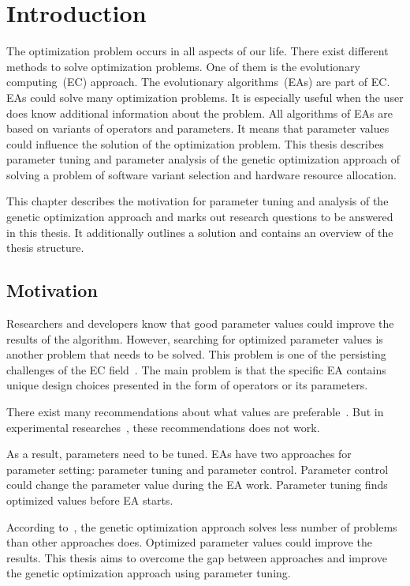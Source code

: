 \chapter{Introduction}\label{intro}
The optimization problem occurs in all aspects of our life. There exist different methods to solve optimization problems. One of them is the evolutionary computing~(EC) approach. The evolutionary algorithms~(EAs) are part of EC. EAs could solve many optimization problems. It is especially useful when the user does know additional information about the problem. All algorithms of EAs are based on variants of operators and parameters. It means that parameter values could influence the solution of the optimization problem. This thesis describes parameter tuning and parameter analysis of the genetic optimization approach of solving a problem of software variant selection and hardware resource allocation.  

This chapter describes the motivation for parameter tuning and analysis of the genetic optimization approach and marks out research questions to be answered in this thesis. It additionally outlines a solution and contains an overview of the thesis structure.

\section{Motivation}
Researchers and developers know that good parameter values could improve the results of the algorithm. However, searching for optimized parameter values is another problem that needs to be solved. This problem is one of the persisting challenges of the EC field~\cite{smit2010parameter}. The main problem is that the specific EA contains unique design choices presented in the form of operators or its parameters. 

There exist many recommendations about what values are preferable~\cite{de2007parameter, sipper2018investigating}.  But in experimental researches~\cite{de2007parameter, shahookar1990genetic, gockel1997influencing}, these recommendations does not work. 

As a result, parameters need to be tuned. EAs have two approaches for parameter setting: parameter tuning and parameter control. Parameter control could change the parameter value during the EA work. Parameter tuning finds optimized values before EA starts.

According to~\cite{ahmad18}, the genetic optimization approach solves less number of problems than other approaches does. Optimized parameter values could improve the results. This thesis aims to overcome the gap between approaches and improve the genetic optimization approach using parameter tuning.


